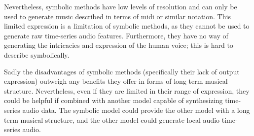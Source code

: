 Nevertheless, symbolic methods have low levels of resolution and can only be used to generate music described in terms of midi or similar notation. This limited expression is a limitation of symbolic methods, as they cannot be used to generate raw time-series audio features. Furthermore, they have no way of generating the intricacies and expression of the human voice; this is hard to describe symbolically. 

Sadly the disadvantages of symbolic methods (specifically their lack of output expression) outweigh any benefits they offer in forms of long term musical structure. Nevertheless, even if they are limited in their range of expression, they could be helpful if combined with another model capable of synthesizing time-series audio data. The symbolic model could provide the other model with a long term musical structure, and the other model could generate local audio time-series audio.